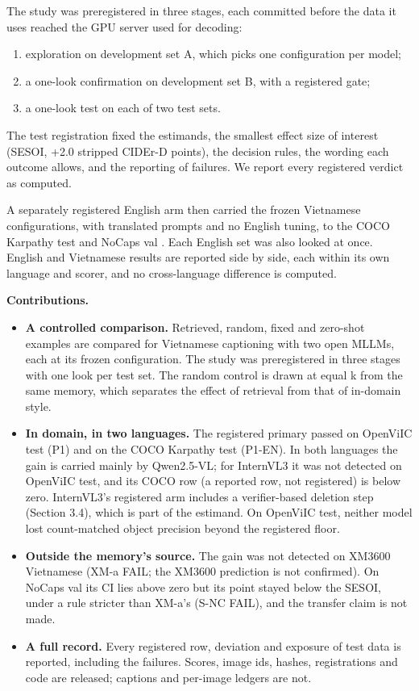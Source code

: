 The study was preregistered in three stages, each committed before the data it uses reached the GPU
server used for decoding:

\begin{enumerate}
\def\labelenumi{\arabic{enumi}.}
\tightlist
\item
  exploration on development set A, which picks one configuration per model;
\item
  a one-look confirmation on development set B, with a registered gate;
\item
  a one-look test on each of two test sets.
\end{enumerate}

The test registration fixed the estimands, the smallest effect size of interest (SESOI, +2.0
stripped CIDEr-D points), the decision rules, the wording each outcome allows, and the reporting of
failures. We report every registered verdict as computed.

A separately registered English arm then carried the frozen Vietnamese configurations, with
translated prompts and no English tuning, to the COCO Karpathy test
\citep{Lin2014COCO, Karpathy2015Split} and NoCaps val \citep{Agrawal2019NoCaps}. Each English set
was also looked at once. English and Vietnamese results are reported side by side, each within its
own language and scorer, and no cross-language difference is computed.

\textbf{Contributions.}

\begin{itemize}
\tightlist
\item
  \textbf{A controlled comparison.} Retrieved, random, fixed and zero-shot examples are compared for
  Vietnamese captioning with two open MLLMs, each at its frozen configuration. The study was
  preregistered in three stages with one look per test set. The random control is drawn at equal k
  from the same memory, which separates the effect of retrieval from that of in-domain style.
\item
  \textbf{In domain, in two languages.} The registered primary passed on OpenViIC test (P1) and on
  the COCO Karpathy test (P1-EN). In both languages the gain is carried mainly by Qwen2.5-VL; for
  InternVL3 it was not detected on OpenViIC test, and its COCO row (a reported row, not registered)
  is below zero. InternVL3's registered arm includes a verifier-based deletion step (Section 3.4),
  which is part of the estimand. On OpenViIC test, neither model lost count-matched object precision
  beyond the registered floor.
\item
  \textbf{Outside the memory's source.} The gain was not detected on XM3600 Vietnamese (XM-a FAIL;
  the XM3600 prediction is not confirmed). On NoCaps val its CI lies above zero but its point stayed
  below the SESOI, under a rule stricter than XM-a's (S-NC FAIL), and the transfer claim is not
  made.
\item
  \textbf{A full record.} Every registered row, deviation and exposure of test data is reported,
  including the failures. Scores, image ids, hashes, registrations and code are released; captions
  and per-image ledgers are not.
\end{itemize}


